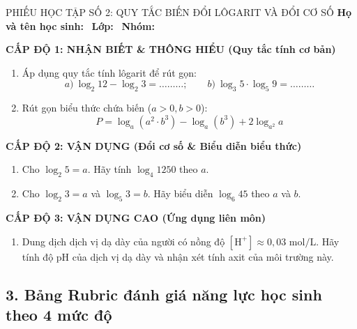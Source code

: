 \documentclass[12pt, a4paper]{article}
\begin{document}
\begin{pedabox}{PHIẾU HỌC TẬP SỐ 2: QUY TẮC BIẾN ĐỔI LÔGARIT VÀ ĐỔI CƠ SỐ}
\textbf{Họ và tên học sinh:} \dotfill \ \textbf{Lớp:} \dotfill \ \textbf{Nhóm:} \dotfill

\noindent \textbf{CẤP ĐỘ 1: NHẬN BIẾT \& THÔNG HIỂU (Quy tắc tính cơ bản)}
\begin{enumerate}[leftmargin=0.6cm]
    \item Áp dụng quy tắc tính lôgarit để rút gọn:
    $$a) \ \log_2 12 - \log_2 3 = \dots\dots\dots; \qquad b) \ \log_3 5 \cdot \log_5 9 = \dots\dots\dots$$
    \item Rút gọn biểu thức chứa biến ($a > 0, b > 0$):
    $$P = \log_a (a^2 \cdot b^3) - \log_a (b^3) + 2\log_{a^2} a$$
\end{enumerate}

\noindent \textbf{CẤP ĐỘ 2: VẬN DỤNG (Đổi cơ số \& Biểu diễn biểu thức)}
\begin{enumerate}[leftmargin=0.6cm]
    \item Cho $\log_2 5 = a$. Hãy tính $\log_4 1250$ theo $a$.
    \item Cho $\log_2 3 = a$ và $\log_5 3 = b$. Hãy biểu diễn $\log_6 45$ theo $a$ và $b$.
\end{enumerate}

\noindent \textbf{CẤP ĐỘ 3: VẬN DỤNG CAO (Ứng dụng liên môn)}
\begin{enumerate}[leftmargin=0.6cm]
    \item Dung dịch dịch vị dạ dày của người có nồng độ $[\text{H}^+] \approx 0{,}03\text{ mol/L}$. Hãy tính độ pH của dịch vị dạ dày và nhận xét tính axit của môi trường này.
\end{enumerate}
\end{pedabox}

\subsection*{3. Bảng Rubric đánh giá năng lực học sinh theo 4 mức độ}
\end{document}
